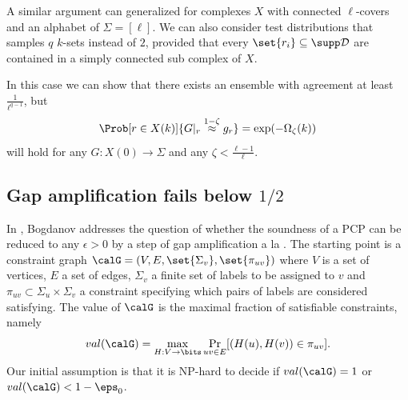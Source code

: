 \begin{remark}
A similar argument can generalized for complexes \(X\) with connected \(\ell\)-covers and an alphabet of \(\Sigma = [\ell]\). We can also consider test distributions that samples \(q\) \(k\)-sets instead of \(2\), provided that every \(\set{r_i} \subseteq \supp \mathcal{D}\) are contained in a simply connected sub complex of \(X\).

In this case we can show that there exists an ensemble with agreement at least \(\frac{1}{\ell^{q-1}}\), but 
\[\Prob[r \in X(k)]{G|_r \overset{1-\zeta}{\approx} g_r} = \exp(-\Omega_\zeta( k ))\]  
will hold for any \(G:X(0) \to \Sigma\) and any \(\zeta < \frac{\ell-1}{\ell}\).
\end{remark}

\subsection[Gap amplification fails below 1/2]{Gap amplification fails below $1/2$} \label{sec:bog}
In \cite{Bogdanov-comment05}, Bogdanov addresses the question of whether the soundness of a PCP can be reduced to any $\epsilon>0$ by a step of gap amplification a la \cite{Dinur07}. The starting point is a constraint graph $\calG = (V,E,\set{\Sigma_v},\set{\pi_{uv}})$ where $V$ is a set of vertices, $E$ a set of edges, $\Sigma_v$ a finite set of labels to be assigned to $v$ and $\pi_{uv} \subset \Sigma_u\times\Sigma_v$ a constraint specifying which pairs of labels are considered satisfying.
The value of $\calG$ is the maximal fraction of satisfiable constraints, namely 
\[ val(\calG)=\max_{H:V\to\bits} \Pr_{uv\in E}[(H(u),H(v))\in \pi_{uv}].\] 
Our initial assumption is that it is NP-hard to decide if $val(\calG)=1$ or $val(\calG)<1-\eps_0$.

